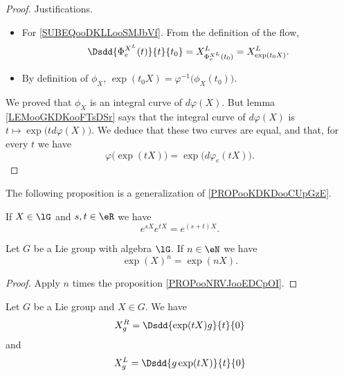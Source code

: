 \begin{proof}
	Justifications.
	\begin{itemize}
		\item For \eqref{SUBEQooDKLLooSMJbVf}. From the definition of the flow,
		      \begin{equation}
			      \Dsdd{ \Phi_e^{X^L}(t) }{t}{t_0}=X^{L}_{\Phi^{X^L}_e(t_0)}=X^L_{\exp(t_0X)}.
		      \end{equation}
		\item
		      By definition of \( \phi_X\), \( \exp(t_0X)=\varphi^{-1}\big( \phi_X(t_0) \big)\).
	\end{itemize}
	We proved that \( \phi_X\) is an integral curve of \( d\varphi(X)\). But lemma \ref{LEMooGKDKooFTsDSr} says that the integral curve of \( d\varphi(X)\) is \( t\mapsto \exp\big( td\varphi(X) \big)\). We deduce that these two curves are equal, and that, for every \( t\) we have
	\begin{equation}
		\varphi\big( \exp(tX) \big)=\exp\big( d\varphi_e(tX) \big).
	\end{equation}
\end{proof}

The following proposition is a generalization of \ref{PROPooKDKDooCUpGzE}.
\begin{proposition}     \label{PROPooNRVJooEDCpOI}
	If \( X\in \lG\) and \( s,t\in \eR\) we have
	\begin{equation}
		e^{sX} e^{tX}= e^{(s+t)X}.
	\end{equation}
\end{proposition}

\begin{lemma}       \label{LEMooRPHVooAtZJnz}
	Let \( G\) be a Lie group with algebra \( \lG\). If \( n\in \eN\) we have
	\begin{equation}
		\exp(X)^n=\exp(nX).
	\end{equation}
\end{lemma}

\begin{proof}
	Apply \( n\) times the proposition \ref{PROPooNRVJooEDCpOI}.
\end{proof}

\begin{lemma}       \label{LEMooLMTZooCvunSl}
	Let \( G\) be a Lie group and \( X\in G\). We have
	\begin{equation}        \label{EQooNBENooPXLENs}
		X^R_g=\Dsdd{  \exp(tX)g }{t}{0}
	\end{equation}
	and
	\begin{equation}
		X^L_g=\Dsdd{  g\exp(tX) }{t}{0}
	\end{equation}
\end{lemma}


